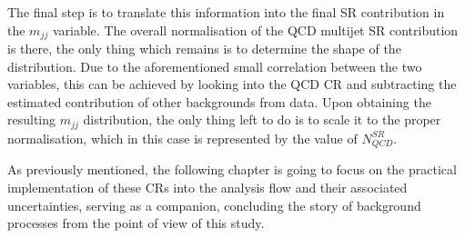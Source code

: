 \hspace{10pt} The final step is to translate this information into the final SR contribution in the $m_{jj}$ variable. The overall normalisation of the QCD multijet SR contribution is there, the only thing which remains is to determine the shape of the distribution. Due to the aforementioned small correlation between the two variables, this can be achieved by looking into the QCD CR and subtracting the estimated contribution of other backgrounds from data. Upon obtaining the resulting $m_{jj}$ distribution, the only thing left to do is to scale it to the proper normalisation, which in this case is represented by the value of $N_{QCD}^{SR}$.

\hspace{10pt} As previously mentioned, the following chapter is going to focus on the practical implementation of these CRs into the analysis flow and their associated uncertainties, serving as a companion, concluding the story of background processes from the point of view of this study.

